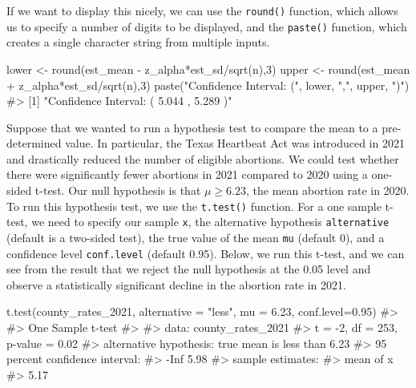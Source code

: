 \documentclass[
  letterpaper,
]{krantz}
\makeatletter
\newenvironment{Shaded}{\begin{snugshade}}{\end{snugshade}}
\newcommand{\AttributeTok}[1]{\textcolor[rgb]{0.40,0.45,0.13}{#1}}
\newcommand{\CommentTok}[1]{\textcolor[rgb]{0.37,0.37,0.37}{#1}}
\newcommand{\DecValTok}[1]{\textcolor[rgb]{0.68,0.00,0.00}{#1}}
\newcommand{\FloatTok}[1]{\textcolor[rgb]{0.68,0.00,0.00}{#1}}
\newcommand{\FunctionTok}[1]{\textcolor[rgb]{0.28,0.35,0.67}{#1}}
\newcommand{\NormalTok}[1]{\textcolor[rgb]{0.00,0.23,0.31}{#1}}
\newcommand{\OtherTok}[1]{\textcolor[rgb]{0.00,0.23,0.31}{#1}}
\newcommand{\SpecialCharTok}[1]{\textcolor[rgb]{0.37,0.37,0.37}{#1}}
\newcommand{\StringTok}[1]{\textcolor[rgb]{0.13,0.47,0.30}{#1}}
\newenvironment{kframe}{%
\medskip{}
\setlength{\fboxsep}{.8em}
 \def\at@end@of@kframe{}%
 \ifinner\ifhmode%
  \def\at@end@of@kframe{\end{minipage}}%
  \begin{minipage}{\columnwidth}%
 \fi\fi%
 \def\FrameCommand##1{\hskip\@totalleftmargin \hskip-\fboxsep
 \colorbox{shadecolor}{##1}\hskip-\fboxsep
     \hskip-\linewidth \hskip-\@totalleftmargin \hskip\columnwidth}%
 \MakeFramed {\advance\hsize-\width
   \@totalleftmargin\z@ \linewidth\hsize
   \@setminipage}}%
 {\par\unskip\endMakeFramed%
 \at@end@of@kframe}
\renewenvironment{Shaded}{\begin{kframe}}{\end{kframe}}
\makeatother
\begin{document}
If we want to display this nicely, we can use the \texttt{round()}
function, which allows us to specify a number of digits to be displayed,
and the \texttt{paste()} function, which creates a single character
string from multiple inputs.

\begin{Shaded}
\begin{Highlighting}[]
\NormalTok{lower }\OtherTok{\textless{}{-}} \FunctionTok{round}\NormalTok{(est\_mean }\SpecialCharTok{{-}}\NormalTok{ z\_alpha}\SpecialCharTok{*}\NormalTok{est\_sd}\SpecialCharTok{/}\FunctionTok{sqrt}\NormalTok{(n),}\DecValTok{3}\NormalTok{)}
\NormalTok{upper }\OtherTok{\textless{}{-}} \FunctionTok{round}\NormalTok{(est\_mean }\SpecialCharTok{+}\NormalTok{ z\_alpha}\SpecialCharTok{*}\NormalTok{est\_sd}\SpecialCharTok{/}\FunctionTok{sqrt}\NormalTok{(n),}\DecValTok{3}\NormalTok{)}
\FunctionTok{paste}\NormalTok{(}\StringTok{"Confidence Interval: ("}\NormalTok{, lower, }\StringTok{","}\NormalTok{, upper, }\StringTok{")"}\NormalTok{)}
\CommentTok{\#\textgreater{} [1] "Confidence Interval: ( 5.044 , 5.289 )"}
\end{Highlighting}
\end{Shaded}

Suppose that we wanted to run a hypothesis test to compare the mean to a
pre-determined value. In particular, the Texas Heartbeat Act was
introduced in 2021 and drastically reduced the number of eligible
abortions. We could test whether there were significantly fewer
abortions in 2021 compared to 2020 using a one-sided t-test. Our null
hypothesis is that \(\mu \geq 6.23\), the mean abortion rate in 2020. To
run this hypothesis test, we use the \texttt{t.test()} function. For a
one sample t-test, we need to specify our sample \texttt{x}, the
alternative hypothesis \texttt{alternative} (default is a two-sided
test), the true value of the mean \texttt{mu} (default 0), and a
confidence level \texttt{conf.level} (default 0.95). Below, we run this
t-test, and we can see from the result that we reject the null
hypothesis at the 0.05 level and observe a statistically significant
decline in the abortion rate in 2021.

\begin{Shaded}
\begin{Highlighting}[]
\FunctionTok{t.test}\NormalTok{(county\_rates\_2021, }\AttributeTok{alternative =} \StringTok{"less"}\NormalTok{, }\AttributeTok{mu =} \FloatTok{6.23}\NormalTok{, }
       \AttributeTok{conf.level=}\FloatTok{0.95}\NormalTok{)}
\CommentTok{\#\textgreater{} }
\CommentTok{\#\textgreater{}  One Sample t{-}test}
\CommentTok{\#\textgreater{} }
\CommentTok{\#\textgreater{} data:  county\_rates\_2021}
\CommentTok{\#\textgreater{} t = {-}2, df = 253, p{-}value = 0.02}
\CommentTok{\#\textgreater{} alternative hypothesis: true mean is less than 6.23}
\CommentTok{\#\textgreater{} 95 percent confidence interval:}
\CommentTok{\#\textgreater{}  {-}Inf 5.98}
\CommentTok{\#\textgreater{} sample estimates:}
\CommentTok{\#\textgreater{} mean of x }
\CommentTok{\#\textgreater{}      5.17}
\end{Highlighting}
\end{Shaded}
\end{document}
